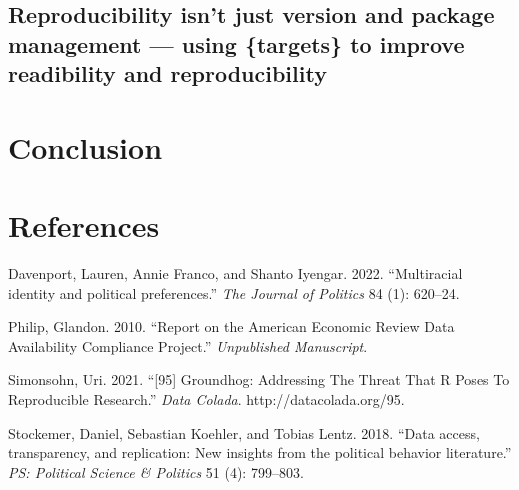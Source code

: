 \documentclass[
  letterpaper,
  DIV=11,
  numbers=noendperiod]{scrartcl}
\newlength{\cslhangindent}
\newlength{\cslentryspacingunit} %
\newenvironment{CSLReferences}[2] %
 {%
  \setlength{\parindent}{0pt}
  \ifodd #1
  \let\oldpar\par
  \def\par{\hangindent=\cslhangindent\oldpar}
  \fi
  \setlength{\parskip}{#2\cslentryspacingunit}
 }%
 {}
\begin{document}
\hypertarget{reproducibility-isnt-just-version-and-package-management-using-targets-to-improve-readibility-and-reproducibility}{%
\subsection{Reproducibility isn't just version and package management
--- using \{targets\} to improve readibility and
reproducibility}\label{reproducibility-isnt-just-version-and-package-management-using-targets-to-improve-readibility-and-reproducibility}}

\newpage

\hypertarget{conclusion}{%
\section{Conclusion}\label{conclusion}}

\newpage

\hypertarget{references}{%
\section*{References}\label{references}}

\hypertarget{refs}{}
\begin{CSLReferences}{1}{0}
\leavevmode{}%
Davenport, Lauren, Annie Franco, and Shanto Iyengar. 2022.
{``{Multiracial identity and political preferences}.''} \emph{The
Journal of Politics} 84 (1): 620--24.

\leavevmode{}%
Philip, Glandon. 2010. {``{Report on the American Economic Review Data
Availability Compliance Project}.''} \emph{Unpublished Manuscript}.

\leavevmode{}%
Simonsohn, Uri. 2021. {``{[}95{]} {Groundhog}: {Addressing The Threat
That R Poses To Reproducible Research}.''} \emph{Data Colada}.
http://datacolada.org/95.

\leavevmode{}%
Stockemer, Daniel, Sebastian Koehler, and Tobias Lentz. 2018. {``{Data
access, transparency, and replication: New insights from the political
behavior literature}.''} \emph{PS: Political Science \& Politics} 51
(4): 799--803.

\end{CSLReferences}
\end{document}
